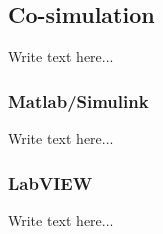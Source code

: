 
\subsection{Co-simulation}
Write text here...

\subsubsection{Matlab/Simulink}
Write text here...

\subsubsection{LabVIEW}
Write text here...

